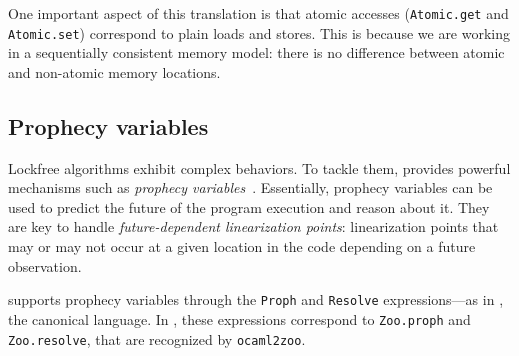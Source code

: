 One important aspect of this translation is that atomic accesses (\texttt{Atomic.get} and \texttt{Atomic.set}) correspond to plain loads and stores.
This is because we are working in a sequentially consistent memory model: there is no difference between atomic and non-atomic memory locations.

\subsection{Prophecy variables}
\label{sec:prophecy}

Lockfree algorithms exhibit complex behaviors.
To tackle them, \Iris provides powerful mechanisms such as \emph{prophecy variables}~\cite{DBLP:journals/pacmpl/JungLPRTDJ20}.
Essentially, prophecy variables can be used to predict the future of the program execution and reason about it.
They are key to handle \emph{future-dependent linearization points}: linearization points that may or may not occur at a given location in the code depending on a future observation.

\Zoo supports prophecy variables through the \texttt{Proph} and \texttt{Resolve} expressions---as in \HeapLang, the canonical \Iris language.
In \OCaml, these expressions correspond to \texttt{Zoo.proph} and \texttt{Zoo.resolve}, that are recognized by \texttt{ocaml2zoo}.
